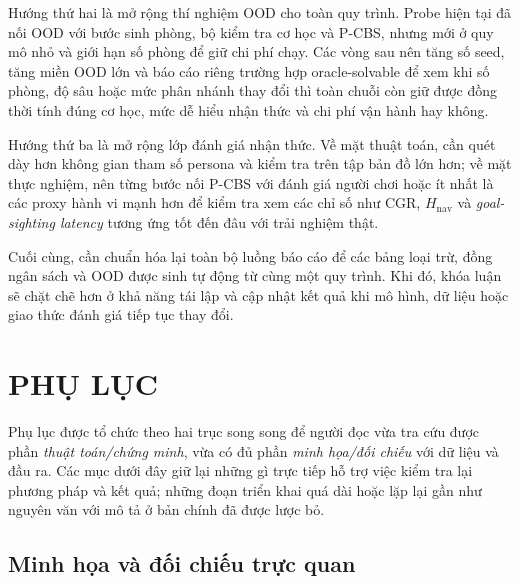 \documentclass[oneside,a4paper,12pt]{extreport}
\renewcommand{\thesection}{\thechapter.\arabic{section}}
\renewcommand{\thesubsection}{\thesection.\arabic{subsection}}
\begin{document}
Hướng thứ hai là mở rộng thí nghiệm OOD cho toàn quy trình. Probe hiện tại đã nối OOD với bước sinh phòng, bộ kiểm tra cơ học và P-CBS, nhưng mới ở quy mô nhỏ và giới hạn số phòng để giữ chi phí chạy. Các vòng sau nên tăng số seed, tăng miền OOD lớn và báo cáo riêng trường hợp oracle-solvable để xem khi số phòng, độ sâu hoặc mức phân nhánh thay đổi thì toàn chuỗi còn giữ được đồng thời tính đúng cơ học, mức dễ hiểu nhận thức và chi phí vận hành hay không.

Hướng thứ ba là mở rộng lớp đánh giá nhận thức. Về mặt thuật toán, cần quét dày hơn không gian tham số persona và kiểm tra trên tập bản đồ lớn hơn; về mặt thực nghiệm, nên từng bước nối P-CBS với đánh giá người chơi hoặc ít nhất là các proxy hành vi mạnh hơn để kiểm tra xem các chỉ số như CGR, $H_{\mathrm{nav}}$ và \emph{goal-sighting latency} tương ứng tốt đến đâu với trải nghiệm thật.

Cuối cùng, cần chuẩn hóa lại toàn bộ luồng báo cáo để các bảng loại trừ, đồng ngân sách và OOD được sinh tự động từ cùng một quy trình. Khi đó, khóa luận sẽ chặt chẽ hơn ở khả năng tái lập và cập nhật kết quả khi mô hình, dữ liệu hoặc giao thức đánh giá tiếp tục thay đổi.

\FloatBarrier
\clearpage
\renewcommand{\bibname}{Tài liệu tham khảo}
\clearpage
{}
{}


\clearpage
\appendix
\chapter*{PHỤ LỤC}
\setcounter{section}{0}
\setcounter{subsection}{0}
\renewcommand{\thesection}{\Alph{section}}
\renewcommand{\thesubsection}{\thesection.\arabic{subsection}}

Phụ lục được tổ chức theo hai trục song song để người đọc vừa tra cứu được phần \emph{thuật toán/chứng minh}, vừa có đủ phần \emph{minh họa/đối chiếu} với dữ liệu và đầu ra. Các mục dưới đây giữ lại những gì trực tiếp hỗ trợ việc kiểm tra lại phương pháp và kết quả; những đoạn triển khai quá dài hoặc lặp lại gần như nguyên văn với mô tả ở bản chính đã được lược bỏ.

\section{Minh họa và đối chiếu trực quan}
\label{app:visual_audits}
\end{document}
